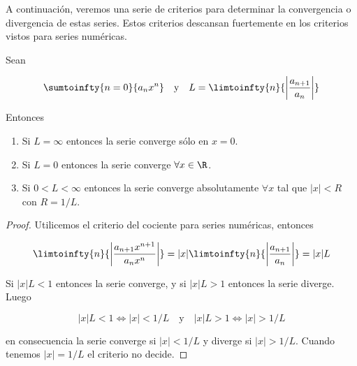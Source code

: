 A continuación, veremos una serie de criterios para determinar la convergencia o divergencia de estas series. Estos criterios descansan fuertemente en los criterios vistos para series numéricas.

\begin{teo}\label{teo:critCauchy}
    Sean
    
    \[
    \sumtoinfty{n=0}{a_nx^n} \quad \text{y} \quad L = \limtoinfty{n}{\left|\frac{a_{n+1}}{a_n}\right|}
    \]
    
    Entonces
    
    \begin{enumerate}
        \item Si $L = \infty$ entonces la serie converge sólo en $x=0$.
        \item Si $L = 0$ entonces la serie converge $\forall x \in \R$.
        \item Si $0 < L < \infty$ entonces la serie converge absolutamente $\forall x$ tal que $|x| < R$ con $R = 1/L$.
    \end{enumerate}
\end{teo}

\begin{proof}
    Utilicemos el criterio del cociente para series numéricas, entonces
    
    \[
    \limtoinfty{n}{\left|\frac{a_{n+1}x^{n+1}}{a_nx^n}\right|} = |x| \limtoinfty{n}{\left|\frac{a_{n+1}}{a_n}\right|} = |x|L
    \]
    
    Si $|x|L < 1$ entonces la serie converge, y si $|x|L > 1$ entonces la serie diverge. Luego
    
    \[
    |x|L < 1 \iff |x| < 1/L \quad \text{y} \quad |x|L > 1 \iff |x| > 1/L
    \]
    
    \noindent en consecuencia la serie converge si $|x| < 1/L$ y diverge si $|x| > 1/L$. Cuando tenemos $|x| = 1/L$ el criterio no decide.
\end{proof}

